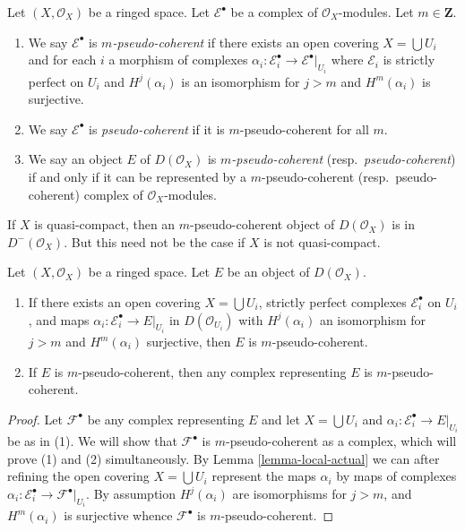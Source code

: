\begin{definition}
\label{definition-pseudo-coherent}
Let $(X, \mathcal{O}_X)$ be a ringed space. Let $\mathcal{E}^\bullet$
be a complex of $\mathcal{O}_X$-modules. Let $m \in \mathbf{Z}$.
\begin{enumerate}
\item We say $\mathcal{E}^\bullet$ is {\it $m$-pseudo-coherent}
if there exists an open covering $X = \bigcup U_i$ and for each $i$
a morphism of complexes
$\alpha_i : \mathcal{E}_i^\bullet \to \mathcal{E}^\bullet|_{U_i}$
where $\mathcal{E}_i$ is strictly perfect on $U_i$ and
$H^j(\alpha_i)$ is an isomorphism for $j > m$ and $H^m(\alpha_i)$
is surjective.
\item We say $\mathcal{E}^\bullet$ is {\it pseudo-coherent}
if it is $m$-pseudo-coherent for all $m$.
\item We say an object $E$ of $D(\mathcal{O}_X)$ is
{\it $m$-pseudo-coherent} (resp.\ {\it pseudo-coherent})
if and only if it can be represented by a $m$-pseudo-coherent
(resp.\ pseudo-coherent) complex of $\mathcal{O}_X$-modules.
\end{enumerate}
\end{definition}

\noindent
If $X$ is quasi-compact, then an $m$-pseudo-coherent object
of $D(\mathcal{O}_X)$ is in $D^-(\mathcal{O}_X)$. But this need
not be the case if $X$ is not quasi-compact.

\begin{lemma}
\label{lemma-pseudo-coherent-independent-representative}
Let $(X, \mathcal{O}_X)$ be a ringed space. Let $E$ be an object
of $D(\mathcal{O}_X)$.
\begin{enumerate}
\item If there exists an open covering $X = \bigcup U_i$,
strictly perfect complexes $\mathcal{E}_i^\bullet$ on $U_i$, and
maps $\alpha_i : \mathcal{E}_i^\bullet \to E|_{U_i}$ in
$D(\mathcal{O}_{U_i})$ with $H^j(\alpha_i)$ an isomorphism for $j > m$
and $H^m(\alpha_i)$ surjective, then $E$ is $m$-pseudo-coherent.
\item If $E$ is $m$-pseudo-coherent, then any complex representing
$E$ is $m$-pseudo-coherent.
\end{enumerate}
\end{lemma}

\begin{proof}
Let $\mathcal{F}^\bullet$ be any complex representing $E$
and let $X = \bigcup U_i$ and
$\alpha_i : \mathcal{E}_i^\bullet \to E|_{U_i}$ be as in (1).
We will show that $\mathcal{F}^\bullet$ is $m$-pseudo-coherent
as a complex, which will prove (1) and (2) simultaneously.
By Lemma \ref{lemma-local-actual}
we can after refining the open covering $X = \bigcup U_i$
represent the maps $\alpha_i$ by maps of complexes
$\alpha_i : \mathcal{E}_i^\bullet \to \mathcal{F}^\bullet|_{U_i}$.
By assumption
$H^j(\alpha_i)$ are isomorphisms for $j > m$, and $H^m(\alpha_i)$
is surjective whence $\mathcal{F}^\bullet$ is
$m$-pseudo-coherent.
\end{proof}

